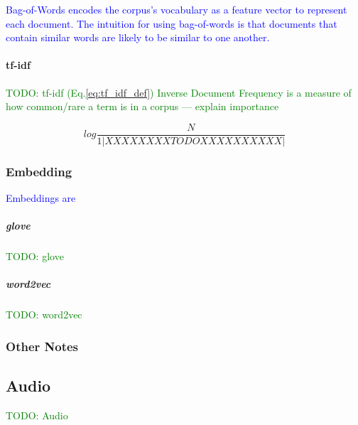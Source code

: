 \textcolor{blue}{Bag-of-Words encodes the corpus's vocabulary as a feature vector to represent each document. The intuition for using bag-of-words is that documents that contain similar words are likely to be similar to one another.}


\paragraph{tf-idf}

\textcolor{green}{TODO: tf-idf (Eq.\ref{eq:tf_idf_def}) Inverse Document Frequency is a measure of how common/rare a term is in a corpus --- explain importance}

\begin{equation}
{log\frac{N}{1|XXXXXXXXTODOXXXXXXXXXX|}}
\label{eq:tf_idf_def}
\end{equation}

\subsubsection{Embedding}





\textcolor{blue}{Embeddings are }

\subparagraph{glove}

\textcolor{green}{TODO: glove}

\subparagraph{word2vec}

\textcolor{green}{TODO: word2vec}

\subsubsection{Other Notes}


\subsection{Audio}


\textcolor{green}{TODO: Audio}
